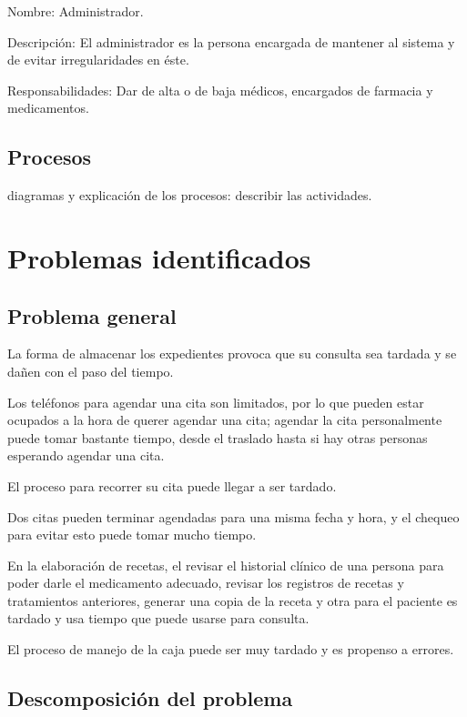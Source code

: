 Nombre: Administrador.

Descripción: El administrador es la persona encargada de mantener al sistema y de evitar irregularidades en éste.

Responsabilidades: Dar de alta o de baja médicos, encargados de farmacia y medicamentos. \\

\subsection{Procesos}

diagramas y explicación de los procesos: describir las actividades.

\section{Problemas identificados}

\subsection{Problema general}

La forma de almacenar los expedientes provoca que su consulta sea tardada y se da\~nen con el paso del tiempo.
 
Los tel\'efonos para agendar una cita son limitados, por lo que pueden estar ocupados a la hora de querer agendar una cita; agendar la cita personalmente puede tomar bastante tiempo, desde el traslado hasta si hay otras personas esperando agendar una cita. 

El proceso para recorrer su cita puede llegar a ser tardado.

Dos citas pueden terminar agendadas para una misma fecha y hora, y el chequeo para evitar esto puede tomar mucho tiempo.

En la elaboraci\'on de recetas, el revisar el historial cl\'inico de una persona para poder darle el medicamento adecuado, revisar los registros de recetas y tratamientos anteriores, generar una copia de la receta y otra para el paciente es tardado y usa tiempo que puede usarse para consulta.

El proceso de manejo de la caja puede ser muy tardado y es propenso a errores.

\subsection{Descomposición del problema}

